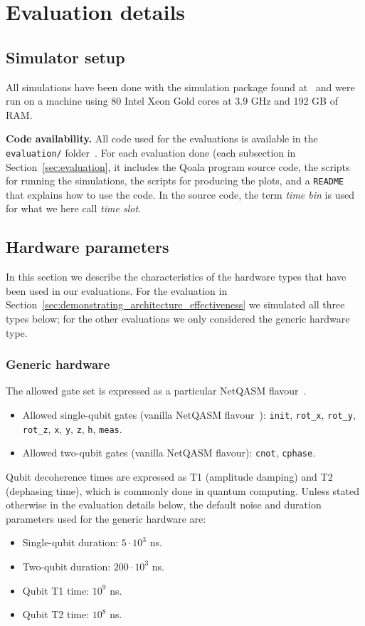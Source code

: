 \section{Evaluation details}
\label{sec:app:evaluation}

\subsection{Simulator setup}
All simulations have been done with the simulation package found at~\cite{qoala2023simulator}
and were run on a machine using 80 Intel Xeon Gold cores at 3.9 GHz and 192 GB of RAM.

\textbf{Code availability.}
All code used for the evaluations is available in the \texttt{evaluation/} folder~\cite{qoala2023simulator}.
For each evaluation done (each subsection in Section~\ref{sec:evaluation}, it includes the Qoala program source code, the scripts for running the simulations, the scripts for producing the plots, and a \texttt{README} that explains how to use the code.
In the source code, the term \textit{time bin} is used for what we here call \textit{time slot}.

\subsection{Hardware parameters}
In this section we describe the characteristics of the hardware types that have been used in our evaluations.
For the evaluation in Section~\ref{sec:demonstrating_architecture_effectiveness} we simulated all three types below;
for the other evaluations we only considered the generic hardware type.

\subsubsection{Generic hardware}
The allowed gate set is expressed as a particular NetQASM flavour~\cite{dahlberg2022netqasm}.

\begin{itemize}
  \item Allowed single-qubit gates (vanilla NetQASM flavour~\cite{dahlberg2022netqasm}):
  \texttt{init}, \texttt{rot\_x}, \texttt{rot\_y}, \texttt{rot\_z}, \texttt{x}, \texttt{y}, \texttt{z}, \texttt{h}, \texttt{meas}.
  \item Allowed two-qubit gates (vanilla NetQASM flavour): \texttt{cnot}, \texttt{cphase}.
\end{itemize}

Qubit decoherence times are expressed as T1 (amplitude damping) and T2 (dephasing time), which is commonly done in quantum computing.
Unless stated otherwise in the evaluation details below, the default noise and duration parameters used for the generic hardware are:
\begin{itemize}
  \item Single-qubit duration: $5 \cdot 10^3$ ns.
  \item Two-qubit duration: $200 \cdot 10^3$ ns.
  \item Qubit T1 time: $10^9$ ns.
  \item Qubit T2 time: $10^8$ ns.
\end{itemize}


